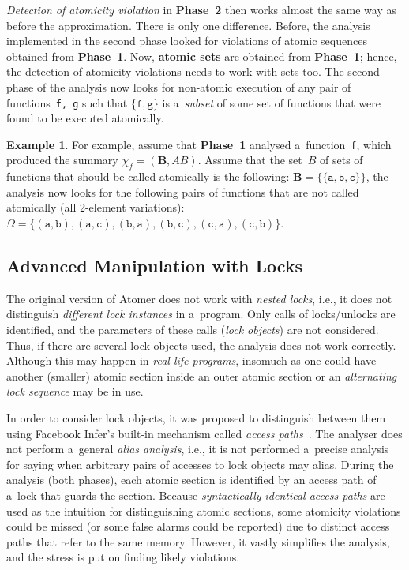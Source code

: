 \documentclass{ExcelAtFIT}
\theoremstyle{definition}
\newtheorem{example}{Example}[section]
\begin{document}
\emph{Detection of atomicity violation} in \textbf{Phase~2} then works almost the same way as before the approximation. There is only one difference. Before, the analysis implemented in the second phase looked for violations of atomic sequences obtained from \textbf{Phase~1}. Now, \textbf{atomic sets} are obtained from \textbf{Phase~1}; hence, the detection of atomicity violations needs to work with sets too. The second phase of the analysis now looks for non-atomic execution of any pair of functions~\texttt{f,~g} such that ${ \{\mathtt{f, g}\} }$ is a~\emph{subset} of some set of functions that were found to be executed atomically.

\begin{example}
    \sloppy
    For example, assume that \textbf{Phase~1} analysed a~function~\texttt{f}, which produced the summary $ \chi_f = {(\boldsymbol{B}, AB)} $. Assume that the set~$ B $ of sets of functions that should be called atomically is the following: $ \boldsymbol{B} = \{{\{\mathtt{a}, \mathtt{b}, \mathtt{c}\}}\} $, the analysis now looks for the following pairs of functions that are not called atomically (all 2-element variations): $ \Omega = \{{(\mathtt{a}, \mathtt{b})}, {(\mathtt{a}, \mathtt{c})}, {(\mathtt{b}, \mathtt{a})}, {(\mathtt{b}, \mathtt{c})}, {(\mathtt{c}, \mathtt{a})}, {(\mathtt{c}, \mathtt{b})}\} $.
\end{example}


\subsection{Advanced Manipulation with Locks}

The original version of Atomer does not work with \emph{nested locks}, i.e., it does not distinguish \emph{different lock instances} in a~program. Only calls of locks/unlocks are identified, and the parameters of these calls (\emph{lock objects}) are not considered. Thus, if there are several lock objects used, the analysis does not work correctly. Although this may happen in \emph{real-life programs}, insomuch as one could have another (smaller) atomic section inside an outer atomic section or an \emph{alternating lock sequence} may be in use.

In order to consider lock objects, it was proposed to distinguish between them using Facebook Infer's built-in mechanism called \emph{access paths}~\cite{accessPath}. The analyser does not perform a~general \emph{alias analysis}, i.e., it is not performed a~precise analysis for saying when arbitrary pairs of accesses to lock objects may alias. During the analysis (both phases), each atomic section is identified by an access path of a~lock that guards the section. Because \emph{syntactically identical access paths} are used as the intuition for distinguishing atomic sections, some atomicity violations could be missed (or some false alarms could be reported) due to distinct access paths that refer to the same memory. However, it vastly simplifies the analysis, and the stress is put on finding likely violations.
\end{document}
